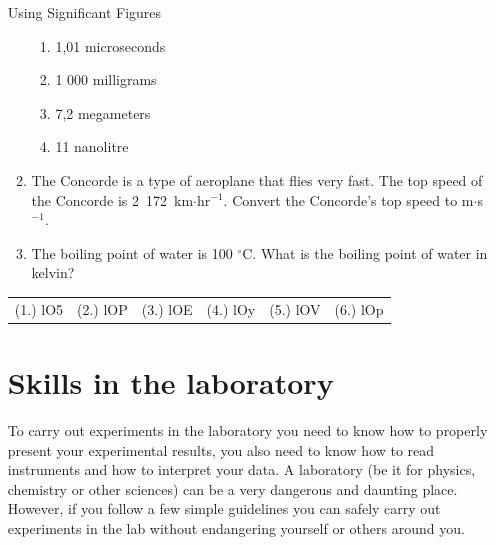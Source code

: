 \begin{enumerate}[label=\textbf{\arabic*}.]
\begin{exercises}{Using Significant Figures }
\begin{enumerate}[noitemsep, label=\textbf{\arabic*}. ]
\begin{enumerate}[noitemsep, label=\textbf{\alph*}. ]
  \item 1,01 microseconds
  \item 1 000 milligrams
  \item 7,2 megameters
  \item 11 nanolitre
  \end{enumerate}
  \item The Concorde is a type of aeroplane that flies very fast. The top speed of the Concorde is 2~172~km$\ensuremath{\cdot}$hr${}^{-1}$. Convert the Concorde's top speed to m$\ensuremath{\cdot}$s${}^{-1}$.        
  \item The boiling point of water is 100 ${}^{\circ }$C. What is the boiling point of water in kelvin?    
\end{enumerate}
\par \practiceinfo
 \par \begin{tabular}[h]{cccccc}
  (1.) lO5  &  (2.) lOP  &  (3.) lOE  &  (4.) lOy  &  (5.) lOV  &  (6.) lOp \end{tabular}
\end{exercises}

\section{Skills in the laboratory}
To carry out experiments in the laboratory you need to know how to properly present your experimental results, you also need to know how to read instruments and how to interpret your data. A laboratory (be it for physics, chemistry or other sciences) can be a very dangerous and daunting place. However, if you follow a few simple guidelines you can safely carry out experiments in the lab without endangering yourself or others around you.

\end{enumerate}
